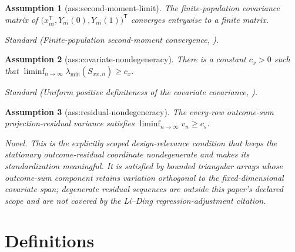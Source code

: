 \documentclass{article}
\newtheorem{assumption}{Assumption}
\begin{document}
\begin{assumption}[ass:second-moment-limit]\label{ass:second-moment-limit}
The finite-population covariance matrix of \(\bigl(x_{ni}^{\mathsf T},Y_{ni}(0),Y_{ni}(1)\bigr)^{\mathsf T}\) converges entrywise to a finite matrix.
\par\smallskip\noindent\emph{Standard} (Finite-population second-moment convergence, \cite{LiDing2017FPCLT}).
\end{assumption}

\begin{assumption}[ass:covariate-nondegeneracy]\label{ass:covariate-nondegeneracy}
There is a constant \(c_x>0\) such that \(\liminf_{n\to\infty}\lambda_{\min}(S_{xx,n})\ge c_x\).
\par\smallskip\noindent\emph{Standard} (Uniform positive definiteness of the covariate covariance, \cite{LiDingRubin2018ReM}).
\end{assumption}

\begin{assumption}[ass:residual-nondegeneracy]\label{ass:residual-nondegeneracy}
The every-row outcome-sum projection-residual variance satisfies \(\liminf_{n\to\infty}v_n\ge c_s\).
\par\smallskip\noindent\emph{Novel.} This is the explicitly scoped design-relevance condition that keeps the stationary outcome-residual coordinate nondegenerate and makes its standardization meaningful. It is satisfied by bounded triangular arrays whose outcome-sum component retains variation orthogonal to the fixed-dimensional covariate span; degenerate residual sequences are outside this paper's declared scope and are not covered by the Li--Ding regression-adjustment citation.
\end{assumption}

\section{Definitions}
\end{document}
